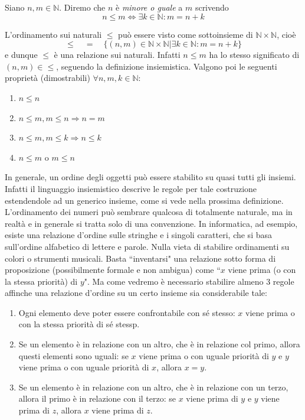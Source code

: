 \documentclass[oneside]{book}
\begin{document}
\begin{tcolorbox}[colback=yellow!30, colframe=yellow!30!black, title={Ordinamento in $\mathbb{N}$}]
Siano $n,m\in\mathbb{N}$. Diremo che $n$ è \textit{minore o guale} a $m$
scrivendo
\[ n\leq m \Longleftrightarrow \exists k\in\mathbb{N}: m = n+k \]
\end{tcolorbox}
L'ordinamento sui naturali $\leq$ può essere visto come sottoinsieme
di $\mathbb{N}\times\mathbb{N}$, cioè \[ \leq \quad=\quad \{(n,m)\in\mathbb{N}\times\mathbb{N}|\exists k\in\mathbb{N}:m=n+k\} \]
e dunque $\leq$ è una relazione sui naturali. Infatti $n\leq m$ ha
lo stesso significato di $(n,m)\in\leq$, seguendo la definizione
insiemistica. Valgono poi le seguenti proprietà
(dimostrabili) $\forall n,m,k\in\mathbb{N}$:
\begin{enumerate}
\item $n\leq n$
\item $n\leq m, m\leq n \Longrightarrow n = m$
\item $n\leq m, m\leq k \Longrightarrow n \leq k$
\item $n\leq m \text{ o } m\leq n$
\end{enumerate}

In generale, un ordine degli oggetti può essere stabilito su
quasi tutti gli insiemi. Infatti il linguaggio insiemistico
descrive le regole per tale costruzione estendendole ad un
generico insieme, come si vede nella prossima definizione.
L'ordinamento dei numeri può sembrare qualcosa di totalmente
naturale, ma in realtà e in generale si tratta solo di una
convenzione. In informatica, ad esempio, esiste una relazione
d'ordine sulle stringhe e i singoli caratteri, che si basa
sull'ordine alfabetico di lettere e parole. Nulla vieta di
stabilire ordinamenti su colori o strumenti musicali. Basta
``inventarsi" una relazione sotto forma di proposizione (possibilmente
formale e non ambigua) come ``$x$ viene prima (o con la stessa
priorità) di $y$". Ma come vedremo è necessario stabilire almeno 3 regole
affinche una relazione d'ordine su un certo insieme sia considerabile tale:
\begin{enumerate}
    \item Ogni elemento deve poter essere confrontabile con sé stesso: $x$ viene prima o con la stessa priorità di sé stessp.
    \item Se un elemento è in relazione con un altro, che è in relazione col primo, allora questi elementi sono uguali: se $x$ viene prima o con uguale priorità di $y$ e $y$ viene prima o con uguale priorità di $x$, allora $x = y$.
    \item Se un elemento è in relazione con un altro, che è in relazione con un terzo, allora il primo è in relazione con il terzo: se $x$ viene prima di $y$ e $y$ viene prima di $z$, allora $x$ viene prima di $z$.
\end{enumerate}
\end{document}
